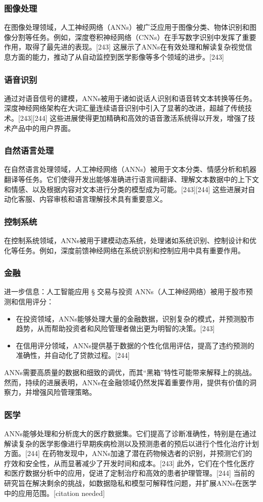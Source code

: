 \subsubsection{图像处理}  
在图像处理领域，人工神经网络（ANNs）被广泛应用于图像分类、物体识别和图像分割等任务。例如，深度卷积神经网络（CNNs）在手写数字识别中发挥了重要作用，取得了最先进的表现。[243] 这展示了ANNs在有效处理和解读复杂视觉信息方面的能力，推动了从自动监控到医学影像等多个领域的进步。[243]
\subsubsection{语音识别}  
通过对语音信号的建模，ANNs被用于诸如说话人识别和语音转文本转换等任务。深度神经网络架构在大词汇量连续语音识别中引入了显著的改进，超越了传统技术。[243][244] 这些进展使得更加精确和高效的语音激活系统得以开发，增强了技术产品中的用户界面。
\subsubsection{自然语言处理}  
在自然语言处理领域，人工神经网络（ANNs）被用于文本分类、情感分析和机器翻译等任务。它们使得开发出能够准确进行语言间翻译、理解文本数据中的上下文和情感、以及根据内容对文本进行分类的模型成为可能。[243][244] 这些进展对自动化客服、内容审核和语言理解技术具有重要意义。
\subsubsection{控制系统}  
在控制系统领域，ANNs被用于建模动态系统，处理诸如系统识别、控制设计和优化等任务。例如，深度前馈神经网络在系统识别和控制应用中具有重要作用。
\subsubsection{金融}  
进一步信息：人工智能应用 § 交易与投资  
ANNs（人工神经网络）被用于股市预测和信用评分：
\begin{itemize}
\item 在投资领域，ANNs能够处理大量的金融数据，识别复杂的模式，并预测股市趋势，从而帮助投资者和风险管理者做出更为明智的决策。[243]  
\item 在信用评分领域，ANNs提供基于数据的个性化信用评估，提高了违约预测的准确性，并自动化了贷款过程。[244]
\end{itemize}  
ANNs需要高质量的数据和细致的调优，而其“黑箱”特性可能带来解释上的挑战。然而，持续的进展表明，ANNs在金融领域仍然发挥着重要作用，提供有价值的洞察力，并增强风险管理策略。
\subsubsection{医学}  
ANNs能够处理和分析庞大的医疗数据集。它们提高了诊断准确性，特别是在通过解读复杂的医学影像进行早期疾病检测以及预测患者的预后以进行个性化治疗计划方面。[244] 在药物发现中，ANNs加速了潜在药物候选者的识别，并预测它们的疗效和安全性，从而显著减少了开发时间和成本。[243] 此外，它们在个性化医疗和医疗数据分析中的应用，促进了定制治疗和高效的患者护理管理。[244] 当前的研究旨在解决剩余的挑战，如数据隐私和模型可解释性问题，并扩展ANNs在医学中的应用范围。[citation needed]

